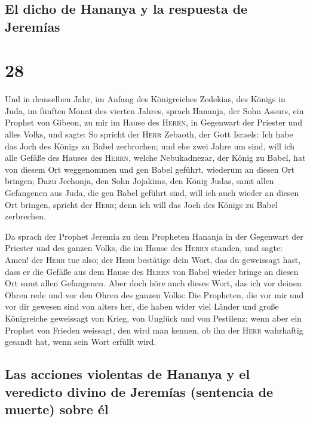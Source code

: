 \hypertarget{el-dicho-de-hananya-y-la-respuesta-de-jeremuxedas}{%
\subsection{El dicho de Hananya y la respuesta de
Jeremías}\label{el-dicho-de-hananya-y-la-respuesta-de-jeremuxedas}}

\hypertarget{section-27}{%
\section{28}\label{section-27}}

 Und in demselben Jahr, im Anfang des Königreiches
Zedekias, des Königs in Juda, im fünften Monat des vierten Jahres,
sprach Hananja, der Sohn Assurs, ein Prophet von Gibeon, zu mir im Hause
des \textsc{Herrn}, in Gegenwart der Priester und alles Volks, und
sagte:  So spricht der \textsc{Herr} Zebaoth, der Gott
Israels: Ich habe das Joch des Königs zu Babel zerbrochen;
 und ehe zwei Jahre um sind, will ich alle Gefäße des
Hauses des \textsc{Herrn}, welche Nebukadnezar, der König zu Babel, hat
von diesem Ort weggenommen und gen Babel geführt, wiederum an diesen Ort
bringen;  Dazu Jechonja, den Sohn Jojakims, den König
Judas, samt allen Gefangenen aus Juda, die gen Babel geführt sind, will
ich auch wieder an diesen Ort bringen, spricht der \textsc{Herr}; denn
ich will das Joch des Königs zu Babel zerbrechen.

 Da sprach der Prophet Jeremia zu dem Propheten Hananja in
der Gegenwart der Priester und des ganzen Volks, die im Hause des
\textsc{Herrn} standen,  und sagte: Amen! der
\textsc{Herr} tue also; der \textsc{Herr} bestätige dein Wort, das du
geweissagt hast, dass er die Gefäße aus dem Hause des \textsc{Herrn} von
Babel wieder bringe an diesen Ort samt allen Gefangenen. 
Aber doch höre auch dieses Wort, das ich vor deinen Ohren rede und vor
den Ohren des ganzen Volks:  Die Propheten, die vor mir
und vor dir gewesen sind von alters her, die haben wider viel Länder und
große Königreiche geweissagt von Krieg, von Unglück und von Pestilenz;
 wenn aber ein Prophet von Frieden weissagt, den wird man
kennen, ob ihn der \textsc{Herr} wahrhaftig gesandt hat, wenn sein Wort
erfüllt wird.

\hypertarget{las-acciones-violentas-de-hananya-y-el-veredicto-divino-de-jeremuxedas-sentencia-de-muerte-sobre-uxe9l}{%
\subsection{Las acciones violentas de Hananya y el veredicto divino de
Jeremías (sentencia de muerte) sobre
él}\label{las-acciones-violentas-de-hananya-y-el-veredicto-divino-de-jeremuxedas-sentencia-de-muerte-sobre-uxe9l}}

